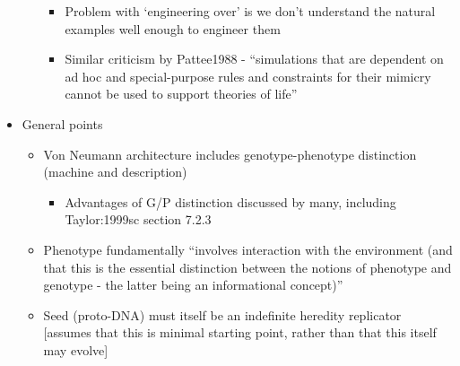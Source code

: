 \begin{itemize}
\begin{itemize}
	      	      		
	      	      \begin{itemize}
	      	      	\item
	      	      	      			
	      	      	      Problem with `engineering over' is we don't understand the natural
	      	      	      examples well enough to engineer them
	      	      	      			
	      	      	\item
	      	      	      			
	      	      	      Similar criticism by Pattee1988 - ``simulations that are dependent
	      	      	      on ad hoc and special-purpose rules and constraints for their
	      	      	      mimicry cannot be used to support theories of life''
	      	      	      			
	      	      \end{itemize}
	      \end{itemize}
	\item
	      	
	      General points
	      	
	      	
	      \begin{itemize}
	      	\item
	      	      		
	      	      Von Neumann architecture includes genotype-phenotype distinction
	      	      (machine and description)
	      	      		
	      	      		
	      	      \begin{itemize}
	      	      	\item
	      	      	      			
	      	      	      Advantages of G/P distinction discussed by many, including
	      	      	      Taylor:1999sc section 7.2.3
	      	      	      			
	      	      \end{itemize}
	      	\item
	      	      		
	      	      Phenotype fundamentally ``involves interaction with the environment
	      	      (and that this is the essential distinction between the notions of
	      	      phenotype and genotype - the latter being an informational
	      	      concept)''
	      	      		
	      	\item
	      	      		
	      	      Seed (proto-DNA) must itself be an indefinite heredity replicator
	      	      {[}assumes that this is minimal starting point, rather than that
	      	      this itself may evolve{]}
	      	      		

\end{itemize}
\end{itemize}

